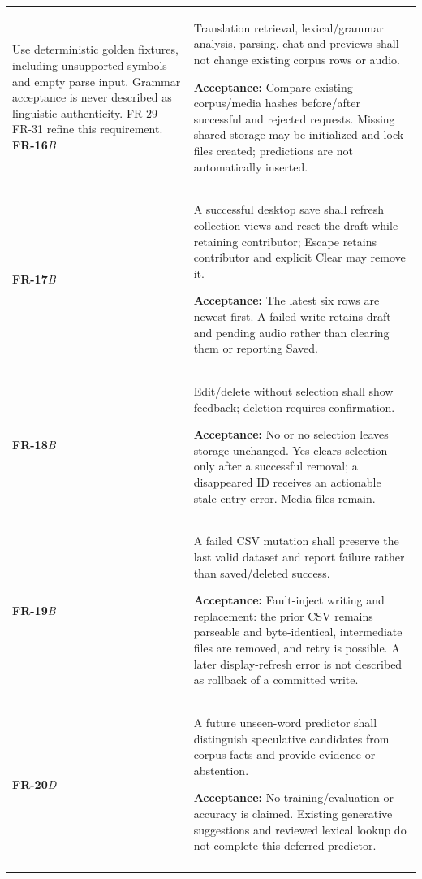 \documentclass[11pt,a4paper]{article}
\newcommand{\requirement}[4]{\textbf{#1}\newline\textit{#2} & #3\par\smallskip\textbf{Acceptance:} #4\\\addlinespace}
\begin{document}
\begin{longtable}{L{1.8cm}L{12.5cm}}
{Use deterministic golden fixtures, including unsupported symbols and empty parse input. Grammar acceptance is never described as linguistic authenticity. FR-29--FR-31 refine this requirement.}
\requirement{FR-16}{B}
{Translation retrieval, lexical/grammar analysis, parsing, chat and previews shall not change existing corpus rows or audio.}
{Compare existing corpus/media hashes before/after successful and rejected requests. Missing shared storage may be initialized and lock files created; predictions are not automatically inserted.}
\requirement{FR-17}{B}
{A successful desktop save shall refresh collection views and reset the draft while retaining contributor; Escape retains contributor and explicit Clear may remove it.}
{The latest six rows are newest-first. A failed write retains draft and pending audio rather than clearing them or reporting Saved.}
\requirement{FR-18}{B}
{Edit/delete without selection shall show feedback; deletion requires confirmation.}
{No or no selection leaves storage unchanged. Yes clears selection only after a successful removal; a disappeared ID receives an actionable stale-entry error. Media files remain.}
\requirement{FR-19}{B}
{A failed CSV mutation shall preserve the last valid dataset and report failure rather than saved/deleted success.}
{Fault-inject writing and replacement: the prior CSV remains parseable and byte-identical, intermediate files are removed, and retry is possible. A later display-refresh error is not described as rollback of a committed write.}
\requirement{FR-20}{D}
{A future unseen-word predictor shall distinguish speculative candidates from corpus facts and provide evidence or abstention.}
{No training/evaluation or accuracy is claimed. Existing generative suggestions and reviewed lexical lookup do not complete this deferred predictor.}
\bottomrule\end{longtable}
\end{document}
